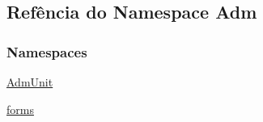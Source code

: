 \hypertarget{namespaceAdm}{\subsection{Refência do Namespace Adm}
\label{namespaceAdm}
}
\subsubsection*{Namespaces}
\begin{DoxyCompactItemize}
\item 
\hyperlink{namespaceAdm_1_1AdmUnit}{Adm\-Unit}
\item 
\hyperlink{namespaceAdm_1_1forms}{forms}
\end{DoxyCompactItemize}
